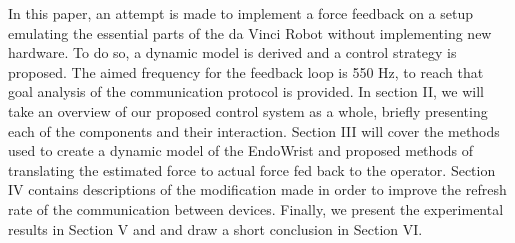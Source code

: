 In this paper, an attempt is made to implement a force feedback on a setup emulating the essential parts of the da Vinci Robot without implementing new hardware. To do so, a dynamic model is derived and a control strategy is proposed. The aimed frequency for the feedback loop is 550 Hz, to reach that goal analysis of the communication protocol is provided. In section II, we will take an overview of our proposed control system as a whole, briefly presenting each of the components and their interaction.
Section III will cover the methods used to create a dynamic model of the EndoWrist and proposed methods of translating the estimated force to actual force fed back to the operator.
Section IV contains descriptions of the modification made in order to improve the refresh rate of the communication between devices.
Finally,  we present the experimental results in Section V and and draw a short conclusion in Section VI.







